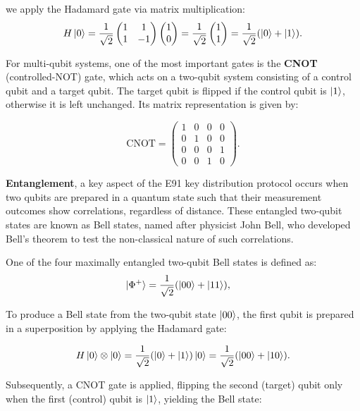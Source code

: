\noindent we apply the Hadamard gate via matrix multiplication:
\[
H\ket{0}
=
\frac{1}{\sqrt{2}}
\begin{pmatrix}
1 & 1 \\
1 & -1
\end{pmatrix}
\begin{pmatrix}
1 \\
0
\end{pmatrix}
=
\frac{1}{\sqrt{2}}
\begin{pmatrix}
1 \\
1
\end{pmatrix}
=
\frac{1}{\sqrt{2}}(\ket{0} + \ket{1}).
\]

For multi-qubit systems, one of the most important gates is the \textbf{CNOT} (controlled-NOT) gate, which acts on a two-qubit system consisting of a control qubit and a target qubit. The target qubit is flipped if the control qubit is $\ket{1}$, otherwise it is left unchanged. Its matrix representation is given by:

\[
\mathrm{CNOT} =
\begin{pmatrix}
1 & 0 & 0 & 0 \\
0 & 1 & 0 & 0 \\
0 & 0 & 0 & 1 \\
0 & 0 & 1 & 0
\end{pmatrix}.
\]

\textbf{Entanglement}, a key aspect of the E91 key distribution protocol occurs when two qubits are prepared in a quantum state such that their measurement outcomes show correlations, regardless of distance. These entangled two-qubit states are known as Bell states, named after physicist John Bell, who developed Bell’s theorem to test the non-classical nature of such correlations.

One of the four maximally entangled two-qubit Bell states is defined as:
\[
\ket{\Phi^{+}} = \frac{1}{\sqrt{2}}(\ket{00} + \ket{11}), \quad
\]

To produce a Bell state from the two-qubit state $\ket{00}$, the first qubit is prepared 
in a superposition by applying the Hadamard gate:

\[
H\ket{0} \otimes \ket{0} = \frac{1}{\sqrt{2}}(\ket{0} + \ket{1})\ket{0} 
= \frac{1}{\sqrt{2}}(\ket{00}+ \ket{10}).
\]

Subsequently, a CNOT gate is applied, flipping the second (target) qubit only when the 
first (control) qubit is $\ket{1}$, yielding the Bell state:

